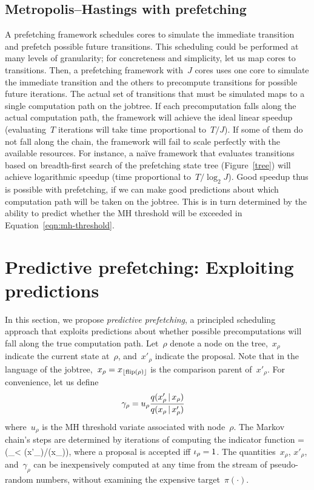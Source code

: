 \documentclass[angelino.tex]{subfiles}
\begin{document}
\subsection{Metropolis--Hastings with prefetching}

A prefetching framework schedules cores to simulate the immediate transition
and prefetch possible future transitions.
%
This scheduling could be performed at many levels of granularity;
for concreteness and simplicity, let us map cores to transitions.
%
Then, a prefetching framework with~$J$ cores uses one core to simulate the
immediate transition and the others to precompute transitions for possible
future iterations.
%
The actual set of transitions that must be simulated maps to a single
computation path on the jobtree.
%
If each precomputation falls along the actual computation path,
the framework will achieve the ideal linear speedup
(evaluating~$T$ iterations will take time proportional to~$T/J$).
%
If some of them do not fall along the chain, the framework will fail to scale
perfectly with the available resources.
%
For instance, a na\"{i}ve framework that evaluates transitions based on 
breadth-first search of the prefetching state tree (Figure~\ref{tree})
%
will achieve logarithmic speedup (time proportional to~$T/\log_2 J$).
Good speedup thus is possible with prefetching, if we can make good predictions
about which computation path will be taken on the jobtree.
%
This is in turn determined by the ability to predict whether the
MH threshold will be exceeded in Equation~\ref{eqn:mh-threshold}. 

\section{Predictive prefetching: Exploiting predictions}
\label{sec:predictive-prefetching}

In this section, we propose \emph{predictive prefetching}, a principled
scheduling approach that exploits predictions about whether
possible precomputations will fall along the true computation path.
%
Let~$\rho$ denote a node on the tree,~$x_\rho$ indicate the current state
at~$\rho$, and~$x'_\rho$ indicate the proposal.
%
Note that in the language of the jobtree,~$x_\rho = x_{\lfloor{\text{flip}(\rho)}\rfloor}$
is the comparison parent of~$x'_\rho$.
%
For convenience, let us define
\begin{align}
\gamma_\rho &= u_\rho \frac{q(x'_\rho \,|\, x_\rho)}{q(x_\rho \,|\, x'_\rho)}
\label{eqn:precomputed-threshold}
\end{align}
where~$u_\rho$ is the MH threshold variate associated with node~$\rho$.
%
The Markov chain's steps are determined by iterations of computing the indicator function
\be
{\Indicator{\rho} = (\gamma_\rho < \pi(x'_\rho)/\pi(x_\rho))},
\label{eqn:indicator}
\ee
where a proposal is accepted iff ${\iota_{\rho} = 1}$.
%
The quantities~$x_\rho$, $x'_\rho$, and~$\gamma_\rho$ can be inexpensively
computed at any time from the stream of pseudo-random numbers, without examining
the expensive target~$\pi(\cdot)$.
\end{document}
